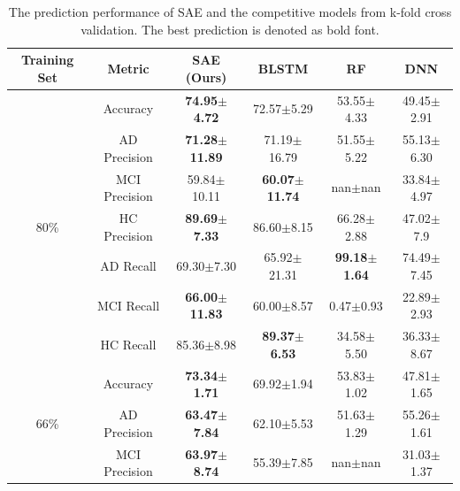 \begin{table}
    \centering
    \caption{The prediction performance of SAE and the competitive models from k-fold cross validation. The best prediction is denoted as bold font.}\label{tab: experimetal results}
    \begin{tabular}{c c cccc}
        \toprule
    \multirow{1}{*}{\bfseries Training Set} & {\bfseries Metric} & \multicolumn{1}{c}{{\bfseries SAE} (Ours)} & \multicolumn{1}{c}{{\bfseries BLSTM}} & \multicolumn{1}{c}{{\bfseries RF}} & {\bfseries DNN}         \\
    \midrule
    \multirow{7}{*}{80\%} %
    & Accuracy & \multicolumn{1}{c}{{\bfseries 74.95$\pm$4.72}} & \multicolumn{1}{c}{72.57$\pm$5.29} & \multicolumn{1}{c}{53.55$\pm$4.33} & 49.45$\pm$2.91\\
    & AD Precision & \multicolumn{1}{c}{{\bfseries 71.28$\pm$11.89}} & \multicolumn{1}{c}{71.19$\pm$16.79} & \multicolumn{1}{c}{51.55$\pm$5.22} & 55.13$\pm$6.30\\
    & MCI Precision & \multicolumn{1}{c}{59.84$\pm$10.11} & \multicolumn{1}{c}{{\bfseries 60.07$\pm$11.74}} & \multicolumn{1}{c}{nan$\pm$nan} & 33.84$\pm$4.97\\
    & HC Precision & \multicolumn{1}{c}{{\bfseries 89.69$\pm$7.33}} & \multicolumn{1}{c}{86.60$\pm$8.15} & \multicolumn{1}{c}{66.28$\pm$2.88} & 47.02$\pm$7.9\\
    & AD Recall & \multicolumn{1}{c}{69.30$\pm$7.30} & \multicolumn{1}{c}{65.92$\pm$21.31} & \multicolumn{1}{c}{{\bfseries 99.18$\pm$1.64}} & 74.49$\pm$7.45\\
    & MCI Recall & \multicolumn{1}{c}{{\bfseries 66.00$\pm$11.83}} & \multicolumn{1}{c}{60.00$\pm$8.57} & \multicolumn{1}{c}{0.47$\pm$0.93} & 22.89$\pm$2.93\\
    & HC Recall & \multicolumn{1}{c}{85.36$\pm$8.98} & \multicolumn{1}{c}{{\bfseries 89.37$\pm$6.53}} & \multicolumn{1}{c}{34.58$\pm$5.50} & 36.33$\pm$8.67\\
    \midrule
    \multirow{7}{*}{66\%} %
    & Accuracy & \multicolumn{1}{c}{{\bfseries 73.34$\pm$1.71}} & \multicolumn{1}{c}{69.92$\pm$1.94} & \multicolumn{1}{c}{53.83$\pm$1.02} & 47.81$\pm$1.65\\
    & AD Precision & \multicolumn{1}{c}{{\bfseries 63.47$\pm$7.84}} & \multicolumn{1}{c}{62.10$\pm$5.53} & \multicolumn{1}{c}{51.63$\pm$1.29} & 55.26$\pm$1.61\\
    & MCI Precision & \multicolumn{1}{c}{{\bfseries 63.97$\pm$8.74}} & \multicolumn{1}{c}{55.39$\pm$7.85} & \multicolumn{1}{c}{nan$\pm$nan} & 31.03$\pm$1.37\\

\end{tabular}
\end{table}
